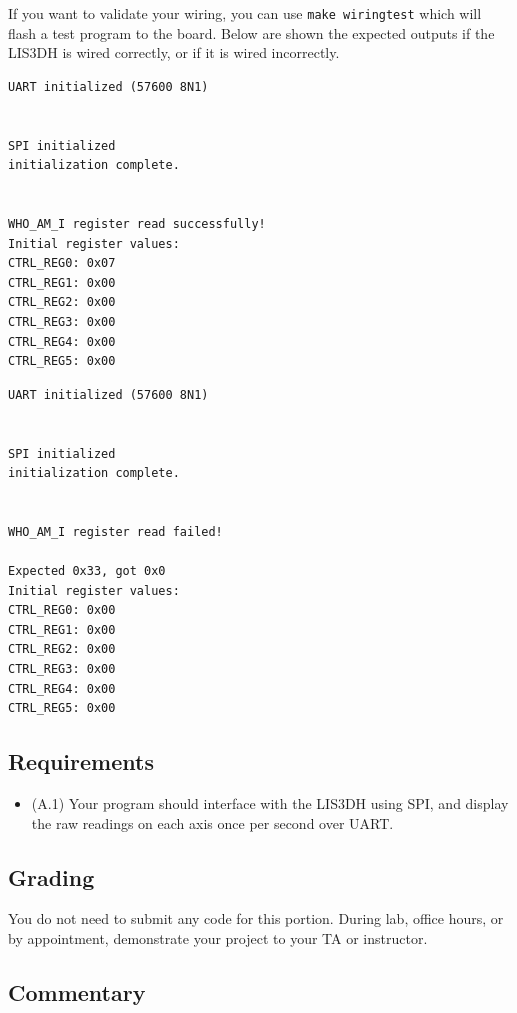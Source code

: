 \documentclass{article}
\begin{document}
If you want to validate your wiring, you can use \texttt{make wiringtest} which
will flash a test program to the board. Below are shown the expected outputs
if the LIS3DH is wired correctly, or if it is wired incorrectly.

\begin{lstlisting}[caption={\texttt{make wiringtest} output with \textbf{correct} wiring.}]
UART initialized (57600 8N1)


SPI initialized
initialization complete.


WHO_AM_I register read successfully!
Initial register values:
CTRL_REG0: 0x07
CTRL_REG1: 0x00
CTRL_REG2: 0x00
CTRL_REG3: 0x00
CTRL_REG4: 0x00
CTRL_REG5: 0x00
\end{lstlisting}


\begin{lstlisting}[caption={\texttt{make wiringtest} output with \textbf{incorrect} wiring.}]
UART initialized (57600 8N1)


SPI initialized
initialization complete.


WHO_AM_I register read failed!

Expected 0x33, got 0x0
Initial register values:
CTRL_REG0: 0x00
CTRL_REG1: 0x00
CTRL_REG2: 0x00
CTRL_REG3: 0x00
CTRL_REG4: 0x00
CTRL_REG5: 0x00
\end{lstlisting}

\subsection{Requirements}

\begin{itemize}

	\item (A.1) Your program should interface with the LIS3DH using SPI,
		and display the raw readings on each axis once per second
		over UART.

\end{itemize}

\subsection{Grading}

You do not need to submit any code for this portion. During lab, office hours,
or by appointment, demonstrate your project to your TA or instructor.

\subsection{Commentary}
\end{document}
